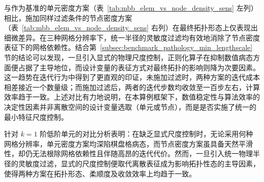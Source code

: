 与作为基准的单元密度方案（表~\ref{tab:mbb_elem_vs_node_density_sens} 左列）相比，施加同样过滤条件的节点密度方案（表~\ref{tab:mbb_elem_vs_node_density_sens} 右列）在最终拓扑形态上仅表现出细微差异。在三种网格分辨率下，统一半径的灵敏度过滤均有效地消除了节点密度表征下的网格依赖性。结合第~\ref{subsec:benchmark_pathology_min_lengthscale} 节的结论可以发现，一旦引入显式的物理尺度控制，正则化算子在抑制数值病态方面便占据了主导地位，而设计变量的表征方式对最终拓扑的影响则降为次要因素。这一趋势在迭代行为中得到了更直观的印证，未施加过滤时，两种方案的迭代成本相差接近一个数量级；而施加过滤后，两者的迭代步数均收敛至一百步左右，计算效率趋于一致。上述对比有力地说明，在本算例框架下，数值稳定性与算法效率的决定性因素并非离散空间的设计变量选取（单元或节点），而是是否实施了统一的最小特征尺度控制。

针对 $k=1$ 阶低阶单元的对比分析表明：在缺乏显式尺度控制时，无论采用何种网格分辨率，单元密度方案均深陷棋盘格病态，而节点密度方案虽具备天然平滑性，却仍无法根除网格依赖性且伴随高昂的迭代代价。然而，一旦引入统一物理半径的灵敏度过滤，显式的尺度控制便取代离散表征成为影响拓扑性态的主导因素，使得两种方案在拓扑形态、柔顺度及收敛效率上均趋于一致。

